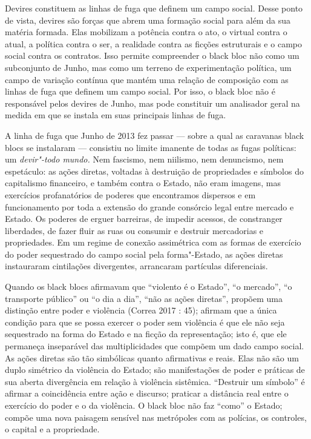 Devires constituem as linhas de fuga que definem um campo social. Desse
ponto de vista, devires são forças que abrem uma formação social para
além da sua matéria formada. Elas mobilizam a potência contra o ato, o
virtual contra o atual, a política contra o ser, a realidade contra as
ficções estruturais e o campo social contra os contratos. Isso permite
compreender o black bloc não como um subconjunto de Junho, mas
como um terreno de experimentação política, um campo de variação
contínua que mantém uma relação de composição com as linhas de fuga que
definem um campo social. Por isso, o black bloc não é responsável
pelos devires de Junho, mas pode constituir um analisador geral na
medida em que se instala em suas principais linhas de fuga.

A linha de fuga que Junho de 2013 fez passar --- sobre a qual as
caravanas black blocs se instalaram --- consistiu no limite
imanente de todas as fugas políticas: um \emph{devir"-todo mundo.} Nem
fascismo, nem niilismo, nem denuncismo, nem espetáculo: as ações
diretas, voltadas à destruição de propriedades e símbolos do capitalismo
financeiro, e também contra o Estado, não eram imagens, mas exercícios
profanatórios de poderes que encontramos dispersos e em funcionamento
por toda a extensão do grande consórcio legal entre mercado e Estado. Os
poderes de erguer barreiras, de impedir acessos, de constranger
liberdades, de fazer fluir as ruas ou consumir e destruir mercadorias e
propriedades. Em um regime de conexão assimétrica com as formas de
exercício do poder sequestrado do campo social pela forma"-Estado, as
ações diretas instauraram cintilações divergentes, arrancaram partículas
diferenciais.

Quando os black blocs afirmavam que ``violento é o Estado'', ``o
mercado'', ``o transporte público'' ou ``o dia a dia'', ``não as ações
diretas'', propõem uma distinção entre poder e violência (Correa 2017 :
45); afirmam que a única condição para que se possa exercer o poder sem
violência é que ele não seja sequestrado na forma do Estado e na ficção
da representação; isto é, que ele permaneça inseparável das
multiplicidades que compõem um dado campo social. As ações diretas são
tão simbólicas quanto afirmativas e reais. Elas não são um duplo
simétrico da violência do Estado; são manifestações de poder e práticas
de sua aberta divergência em relação à violência sistêmica. ``Destruir
um símbolo'' é afirmar a coincidência entre ação e discurso; praticar a
distância real entre o exercício do poder e o da violência. O
black bloc não faz ``como'' o Estado; compõe uma nova paisagem
sensível nas metrópoles com as polícias, os controles, o capital e a
propriedade.

